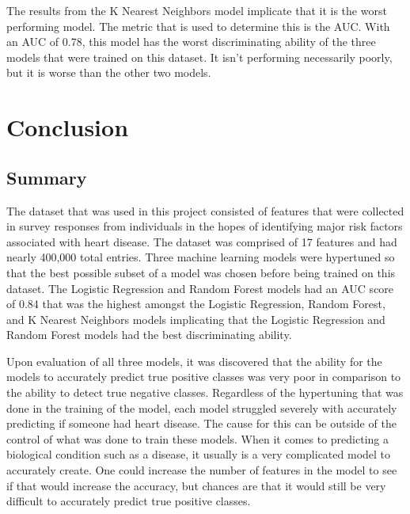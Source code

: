 The results from the K Nearest Neighbors model implicate that it is the worst performing model. The metric that is used to determine this is the AUC. With an AUC of 0.78, this model has the worst discriminating ability of the three models
that were trained on this dataset. It isn't performing necessarily poorly, but it is worse than the other two models.


\clearpage

\chapter{Conclusion}

\section{Summary}

The dataset that was used in this project consisted of features that were collected in survey responses from individuals in the hopes of identifying major risk factors associated with heart disease. The dataset was comprised of 17 features
and had nearly 400,000 total entries. Three machine learning models were hypertuned so that the best possible subset of a model was chosen before being trained on this dataset. The Logistic Regression and Random Forest models had an AUC
score of 0.84 that was the highest amongst the Logistic Regression, Random Forest, and K Nearest Neighbors models implicating that the Logistic Regression and Random Forest models had the best discriminating ability.

Upon evaluation of all three models, it was discovered that the ability for the models to accurately predict true positive classes was very poor in comparison to the ability to detect true negative classes. Regardless of the hypertuning that
was done in the training of the model, each model struggled severely with accurately predicting if someone had heart disease. The cause for this can be outside of the control of what was done to train these models. When it comes to predicting
a biological condition such as a disease, it usually is a very complicated model to accurately create. One could increase the number of features in the model to see if that would increase the accuracy, but chances are that it would still be
very difficult to accurately predict true positive classes.

